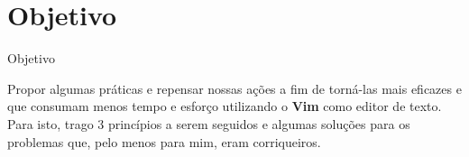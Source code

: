 \section{Objetivo}
\begin{frame}{Objetivo}

Propor algumas práticas e repensar nossas ações a fim de torná-las mais eficazes e que consumam
menos tempo e esforço utilizando o \textbf{Vim} como editor de texto. Para isto, trago 3 princípios a serem 
seguidos e algumas soluções para os problemas que, pelo menos para mim, eram corriqueiros.

\end{frame}

